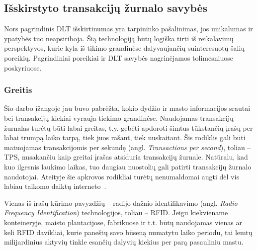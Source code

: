 
\subsection{Išskirstyto transakcijų žurnalo savybės} \label{subsection:dlt-properties}

Nors pagrindinis DLT išskirtinumas yra tarpininko pašalinimas, jos unikalumas ir ypatybės tuo neapsiriboja. Šią technologiją būtų logiška tirti iš reikalavimų perspektyvos, kurie kyla iš tikimo grandinėse dalyvaujančių suinteresuotų šalių poreikių. Pagrindiniai poreikiai ir DLT savybės nagrinėjamos tolimesniuose poskyriuose.




\subsubsection{Greitis} \label{subsection:dlt-speed}

Šio darbo įžangoje jau buvo pabrėžta, kokio dydžio ir masto informacijos srautai bei transakcijų kiekiai vyrauja tiekimo grandinėse. Naudojamas transakcijų žurnalas turėtų būti labai greitas, t.y. gebėti apdoroti šimtus tūkstančių įrašų per labai trumpą laiko tarpą, tiek juos rašant, tiek nuskaitant. Šis rodiklis gali būti matuojamas transakcijomis per sekundę (angl. \textit{Transactions per second}), toliau – TPS, nusakančiu kaip greitai įrašas atsiduria transakcijų žurnale. Natūralu, kad kuo ilgesnis laukimo laikas, tuo daugiau nuostolių gali patirti transakcijų žurnalo naudotojai. Ateityje šie apkrovos rodikliai turėtų nenumaldomai augti dėl vis labiau taikomo daiktų interneto~\cite{kaur2018edge}. 

Vienas iš įrašų kūrimo pavyzdžių – radijo dažnio identifikavimo (angl. \textit{Radio Frequency Identification}) technologijos, toliau – RFID. Jeigu kiekviename konteineryje, maisto plantacijose, fabrikuose ir t.t. būtų naudojamas vienas ar keli RFID davikliai, kurie paneštų savo būseną numatytu laiko periodu, tai lemtų milijardinius aktyvių tinkle esančių dalyvių kiekius per parą pasauliniu mastu.


